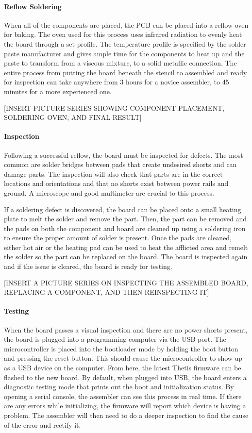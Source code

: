 \paragraph*{Reflow Soldering} When all of the components are placed, the PCB can be placed into a reflow oven for baking.
The oven used for this process uses infrared radiation to evenly heat the board through a set profile.
The temperature profile is specified by the solder paste manufacturer and gives ample time for the components to heat up and the paste to transform from a viscous mixture, to a solid metallic connection.
The entire process from putting the board beneath the stencil to assembled and ready for inspection can take anywhere from 3 hours for a novice assembler, to 45 minutes for a more experienced one.

[INSERT PICTURE SERIES SHOWING COMPONENT PLACEMENT, SOLDERING OVEN, AND FINAL RESULT]

\paragraph*{Inspection} Following a successful reflow, the board must be inspected for defects.
The most common are solder bridges between pads that create undesired shorts and can damage parts.
The inspection will also check that parts are in the correct locations and orientations and that no shorts exist between power rails and ground.
A microscope and good multimeter are crucial to this process.

If a soldering defect is discovered, the board can be placed onto a small heating plate to melt the solder and remove the part.
Then, the part can be removed and the pads on both the component and board are cleaned up using a soldering iron to ensure the proper amount of solder is present.
Once the pads are cleaned, either hot air or the heating pad can be used to heat the afflicted area and remelt the solder so the part can be replaced on the board.
The board is inspected again and if the issue is cleared, the board is ready for testing.

[INSERT A PICTURE SERIES ON INSPECTING THE ASSEMBLED BOARD, REPLACING A COMPONENT, AND THEN REINSPECTING IT]

\paragraph*{Testing} When the board passes a visual inspection and there are no power shorts present, the board is plugged into a programming computer via the USB port.
The microcontroller is placed into the bootloader mode by holding the boot button and pressing the reset button.
This should cause the microcontroller to show up as a USB device on the computer.
From here, the latest Thetis firmware can be flashed to the new board.
By default, when plugged into USB, the board enters a diagnostic testing mode that prints out the boot and initialization status.
By opening a serial console, the assembler can see this process in real time.
If there are any errors while initializing, the firmware will report which device is having a problem.
The assembler will then need to do a deeper inspection to find the cause of the error and rectify it.

